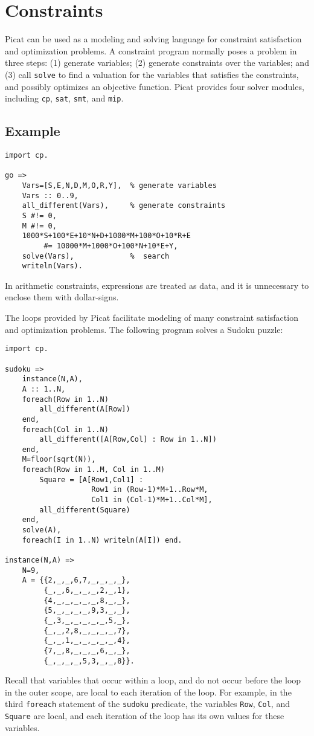 \section{\label{section:Constraints}Constraints}
Picat can be used as a modeling and solving language for constraint satisfaction and optimization problems.  A constraint program normally poses a problem in three steps: (1) generate variables; (2) generate constraints over the variables; and (3) call \texttt{solve} to find a valuation for the variables that satisfies the constraints, and possibly optimizes an objective function. Picat provides four solver modules, including \texttt{cp}, \texttt{sat}, \texttt{smt}, and \texttt{mip}.

\subsection*{Example}
\begin{verbatim}
import cp.

go => 
    Vars=[S,E,N,D,M,O,R,Y],  % generate variables
    Vars :: 0..9,
    all_different(Vars),     % generate constraints
    S #!= 0,
    M #!= 0,
    1000*S+100*E+10*N+D+1000*M+100*O+10*R+E 
         #= 10000*M+1000*O+100*N+10*E+Y,
    solve(Vars),             %  search
    writeln(Vars).
\end{verbatim}
In arithmetic constraints, expressions are treated as data, and it is unnecessary to enclose them with dollar-signs.

The loops provided by Picat facilitate modeling of many constraint satisfaction and optimization problems. The following program solves a Sudoku puzzle:
\begin{verbatim}
import cp.

sudoku =>
    instance(N,A),
    A :: 1..N,
    foreach(Row in 1..N)
        all_different(A[Row])
    end,
    foreach(Col in 1..N)
        all_different([A[Row,Col] : Row in 1..N])
    end,
    M=floor(sqrt(N)),
    foreach(Row in 1..M, Col in 1..M) 
        Square = [A[Row1,Col1] : 
                    Row1 in (Row-1)*M+1..Row*M, 
                    Col1 in (Col-1)*M+1..Col*M],
        all_different(Square)
    end,
    solve(A),
    foreach(I in 1..N) writeln(A[I]) end.

instance(N,A) =>
    N=9,
    A = {{2,_,_,6,7,_,_,_,_},
         {_,_,6,_,_,_,2,_,1},
         {4,_,_,_,_,_,8,_,_},
         {5,_,_,_,_,9,3,_,_},
         {_,3,_,_,_,_,_,5,_},
         {_,_,2,8,_,_,_,_,7},
         {_,_,1,_,_,_,_,_,4},
         {7,_,8,_,_,_,6,_,_},
         {_,_,_,_,5,3,_,_,8}}.
\end{verbatim}
Recall that variables that occur within a loop, and do not occur before the loop in the outer scope, are local to each iteration of the loop. For example, in the third \texttt{foreach} statement of the \texttt{sudoku} predicate, the variables \texttt{Row}, \texttt{Col}, and \texttt{Square} are local, and each iteration of the loop has its own values for these variables.

